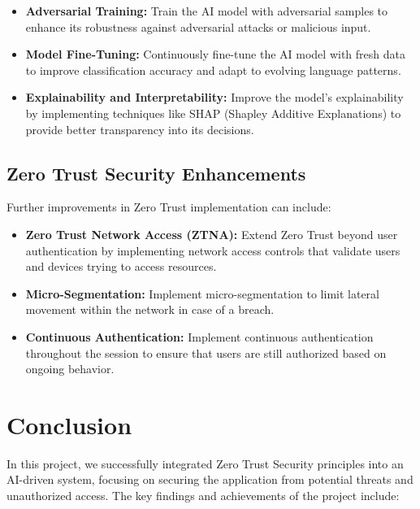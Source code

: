 \documentclass[a4paper,12pt]{article}
\begin{document}
\begin{itemize}
    \item \textbf{Adversarial Training:} Train the AI model with adversarial samples to enhance its robustness against adversarial attacks or malicious input.
    \item \textbf{Model Fine-Tuning:} Continuously fine-tune the AI model with fresh data to improve classification accuracy and adapt to evolving language patterns.
    \item \textbf{Explainability and Interpretability:} Improve the model's explainability by implementing techniques like SHAP (Shapley Additive Explanations) to provide better transparency into its decisions.
\end{itemize}

\subsection{Zero Trust Security Enhancements}
Further improvements in Zero Trust implementation can include:

\begin{itemize}
    \item \textbf{Zero Trust Network Access (ZTNA):} Extend Zero Trust beyond user authentication by implementing network access controls that validate users and devices trying to access resources.
    \item \textbf{Micro-Segmentation:} Implement micro-segmentation to limit lateral movement within the network in case of a breach.
    \item \textbf{Continuous Authentication:} Implement continuous authentication throughout the session to ensure that users are still authorized based on ongoing behavior.
\end{itemize}

\section{Conclusion}

In this project, we successfully integrated Zero Trust Security principles into an AI-driven system, focusing on securing the application from potential threats and unauthorized access. The key findings and achievements of the project include:
\end{document}
